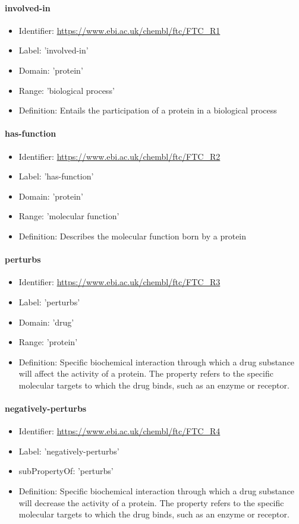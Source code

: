 \paragraph{involved-in}
\begin{itemize}
  \item Identifier: \url{https://www.ebi.ac.uk/chembl/ftc/FTC\_R1}
  \item Label: 'involved-in'
  \item Domain: 'protein'
  \item Range: 'biological process'
  \item Definition: Entails the participation of a protein in a biological process
\end{itemize}

\paragraph{has-function}
\begin{itemize}
  \item Identifier: \url{https://www.ebi.ac.uk/chembl/ftc/FTC\_R2}
  \item Label: 'has-function'
  \item Domain: 'protein'
  \item Range: 'molecular function'
  \item Definition: Describes the molecular function born by a protein
\end{itemize}

\paragraph{perturbs}
\begin{itemize}
  \item Identifier: \url{https://www.ebi.ac.uk/chembl/ftc/FTC\_R3}
  \item Label: 'perturbs'
  \item Domain: 'drug'
  \item Range: 'protein'
  \item Definition: Specific biochemical interaction through which a drug substance will affect the activity of a protein. The property refers to the specific molecular targets to which the drug binds, such as an enzyme or receptor.
\end{itemize}

\paragraph{negatively-perturbs}
\begin{itemize}
  \item Identifier: \url{https://www.ebi.ac.uk/chembl/ftc/FTC\_R4}
  \item Label: 'negatively-perturbs'
  \item subPropertyOf: 'perturbs'
  \item Definition: Specific biochemical interaction through which a drug substance will decrease the activity of a protein. The property refers to the specific molecular targets to which the drug binds, such as an enzyme or receptor.
\end{itemize}

